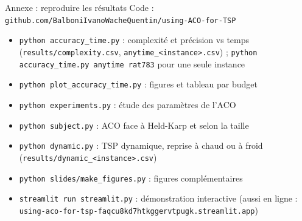 \documentclass[aspectratio=169,11pt]{beamer}
\begin{document}
\begin{frame}[fragile]{Annexe : reproduire les résultats}
  \footnotesize
  Code : \texttt{github.com/BalboniIvanoWacheQuentin/using-ACO-for-TSP}
  \begin{itemize}
    \item \texttt{python accuracy\_time.py} : complexité et précision vs temps
          (\texttt{results/complexity.csv}, \texttt{anytime\_<instance>.csv}) ;
          \texttt{python accuracy\_time.py anytime rat783} pour une seule instance
    \item \texttt{python plot\_accuracy\_time.py} : figures et tableau par budget
    \item \texttt{python experiments.py} : étude des paramètres de l'ACO
    \item \texttt{python subject.py} : ACO face à Held-Karp et selon la taille
    \item \texttt{python dynamic.py} : TSP dynamique, reprise à chaud ou à froid
          (\texttt{results/dynamic\_<instance>.csv})
    \item \texttt{python slides/make\_figures.py} : figures complémentaires
    \item \texttt{streamlit run streamlit.py} : démonstration interactive (aussi en ligne :
          \nolinkurl{using-aco-for-tsp-faqcu8kd7htkggervtpugk.streamlit.app})
  \end{itemize}
\end{frame}
\end{document}
